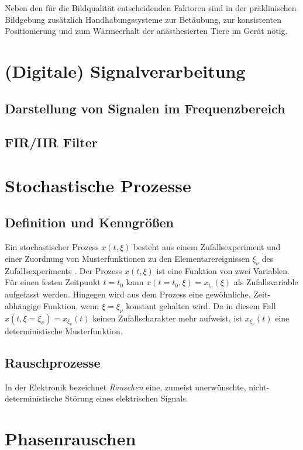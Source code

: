Neben den für die Bildqualität entscheidenden Faktoren sind in der präklinischen Bildgebung zusätzlich Handhabungssysteme zur Betäubung, zur konsistenten Positionierung und zum Wärmeerhalt der anästhesierten Tiere im Gerät nötig.

\section{(Digitale) Signalverarbeitung}

\subsection{Darstellung von Signalen im Frequenzbereich}
\subsection{FIR/IIR Filter}

\section{Stochastische Prozesse}

\subsection{Definition und Kenngrößen}
Ein stochastischer Prozess $x(t,\xi)$ besteht aus einem Zufallsexperiment und einer Zuordnung von Musterfunktionen zu den Elementarereignissen $\xi_\nu$ des Zufallsexperiments \cite[S.~243]{Leon2015}. Der Prozess $x(t,\xi)$ ist eine Funktion von zwei Variablen. Für einen festen Zeitpunkt $t=t_0$ kann $x(t=t_0,\xi)=x_{t_0}(\xi)$ als Zufallsvariable aufgefasst werden. Hingegen wird aus dem Prozess eine gewöhnliche, Zeit-abhängige Funktion, wenn $\xi=\xi_\nu$ konstant gehalten wird. Da in diesem Fall $x(t,\xi=\xi_\nu)=x_{\xi_\nu}(t)$ keinen Zufallscharakter mehr aufweist, ist $x_{\xi_\nu}(t)$ eine deterministische Musterfunktion.



\subsection{Rauschprozesse}
In der Elektronik bezeichnet \textit{Rauschen} eine, zumeist unerwünschte, nicht-\-deterministische Störung eines elektrischen Signals.

\section{Phasenrauschen}


